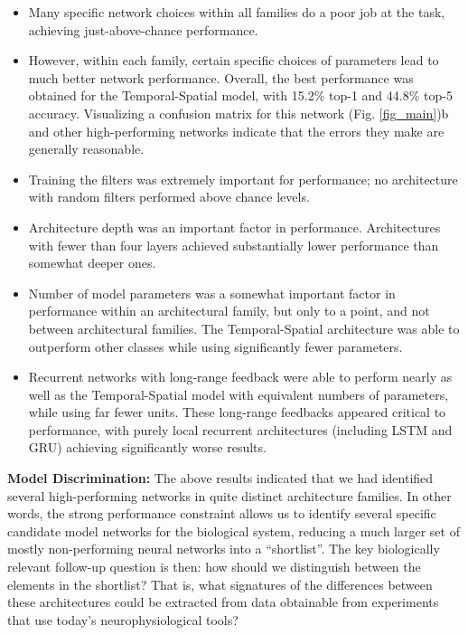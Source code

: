 \begin{itemize}[leftmargin=*,itemsep=0ex,topsep=1ex]
   \item Many specific network choices within all families do a poor job at the task, achieving just-above-chance performance.
   \item However, within each family, certain specific choices of parameters lead to much better network performance.
   Overall, the best performance was obtained for the Temporal-Spatial model, with 15.2\% top-1 and 44.8\% top-5 accuracy.
   Visualizing a confusion matrix for this network (Fig. \ref{fig_main})b  and other high-performing networks indicate that the errors they make are generally reasonable.
   \item Training the filters was extremely important for performance; no architecture with random filters performed above chance levels.
   \item Architecture depth was an important factor in performance. Architectures with fewer than four layers achieved substantially lower performance than somewhat deeper ones.
   \item Number of model parameters was a somewhat important factor in performance within an architectural family, but only to a point, and not between architectural families.
   The Temporal-Spatial architecture was able to outperform other classes while using significantly fewer parameters.
   \item Recurrent networks with long-range feedback were able to perform nearly as well as the Temporal-Spatial model with equivalent numbers of parameters, while using far fewer units.
   These long-range feedbacks appeared critical to performance, with purely local recurrent architectures (including LSTM and GRU) achieving significantly worse results.
\end{itemize}

\textbf{Model Discrimination:}  The above results indicated that we had identified several high-performing networks in quite distinct architecture families.
In other words, the strong performance constraint allows us to identify several specific candidate model networks for the biological system, reducing a much larger set of mostly non-performing neural networks into a ``shortlist''.
The key biologically relevant follow-up question is then: how should we distinguish between the elements in the shortlist? 
That is, what signatures of the differences between these architectures could be extracted from data obtainable from experiments that use today's neurophysiological tools?


